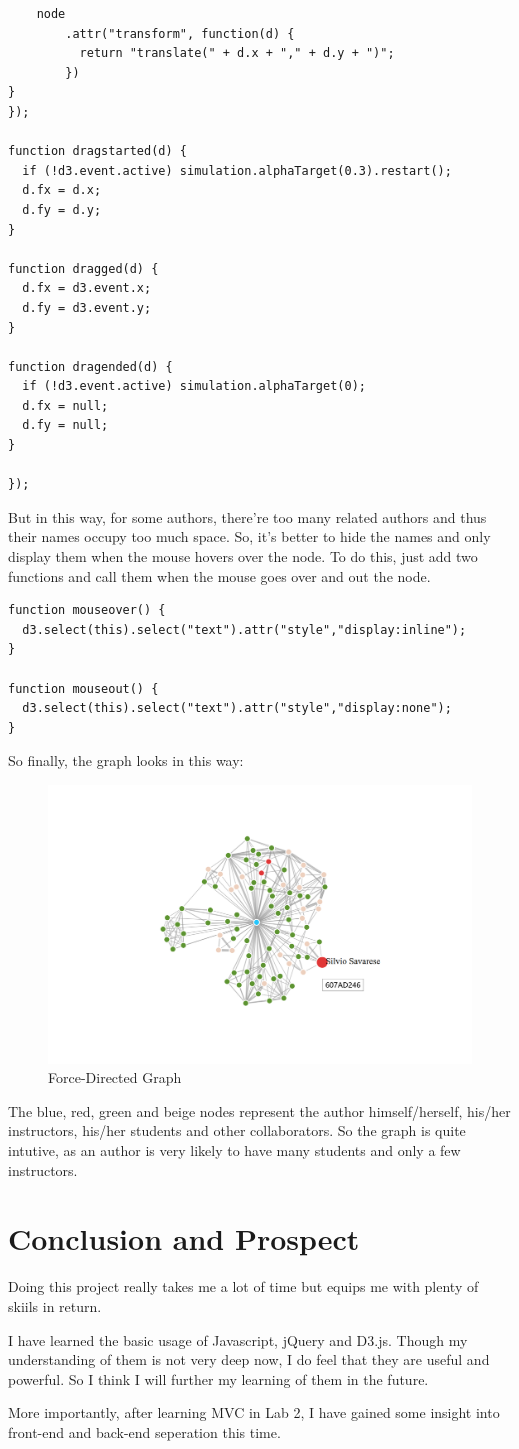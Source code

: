 \documentclass[a4paper]{article}
\begin{document}
\begin{verbatim}
    node
        .attr("transform", function(d) {
          return "translate(" + d.x + "," + d.y + ")";
        })
}
});

function dragstarted(d) {
  if (!d3.event.active) simulation.alphaTarget(0.3).restart();
  d.fx = d.x;
  d.fy = d.y;
}

function dragged(d) {
  d.fx = d3.event.x;
  d.fy = d3.event.y;
}

function dragended(d) {
  if (!d3.event.active) simulation.alphaTarget(0);
  d.fx = null;
  d.fy = null;
}

});
\end{verbatim}
But in this way, for some authors, there're too many related authors and thus their names occupy too much space. So, it's better to hide the names and only display them when the mouse hovers over the node.
To do this, just add two functions and call them when the mouse goes over and out the node.
\begin{verbatim}
function mouseover() {
  d3.select(this).select("text").attr("style","display:inline");
}

function mouseout() {
  d3.select(this).select("text").attr("style","display:none");
}
\end{verbatim}
So finally, the graph looks in this way:
\begin{figure}[H]
\centering
\includegraphics[width=.8\textwidth]{img/graph.png}
\caption{Force-Directed Graph}
\end{figure}
The blue, red, green and beige nodes represent the author himself/herself, his/her instructors, his/her students and other collaborators. So the graph is quite intutive, as an author is very likely to have many students and only a few instructors.
    \newpage
    \section{Conclusion and Prospect}
Doing this project really takes me a lot of time but equips me with plenty of skiils in return. 

I have learned the basic usage of Javascript, jQuery and D3.js. Though my understanding of them is not very deep now, I do feel that they are useful and powerful. So I think I will further my learning of them in the future.

More importantly, after learning MVC in Lab 2, I have gained some insight into front-end and back-end seperation this time. 
\end{document}
